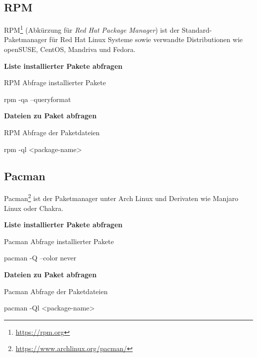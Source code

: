 \subsection{RPM}

RPM\footnote{\url{https://rpm.org}} (Abkürzung für \textit{Red Hat Package
Manager}) ist der Standard-Paketmanager für Red Hat Linux Systeme sowie
verwandte Distributionen wie openSUSE, CentOS, Mandriva und Fedora.

\textbf{Liste installierter Pakete abfragen}

\begin{listing}[H]
\caption{RPM Abfrage installierter Pakete}
\begin{bashcode}
rpm -qa --queryformat %
\end{bashcode}
\end{listing}

\textbf{Dateien zu Paket abfragen}

\begin{listing}[H]
\caption{RPM Abfrage der Paketdateien}
\begin{bashcode}
rpm -ql <package-name>
\end{bashcode}
\end{listing}


\subsection{Pacman}

Pacman\footnote{\url{https://www.archlinux.org/pacman/}} ist der Paketmanager
unter Arch Linux und Derivaten wie Manjaro Linux oder Chakra.

\textbf{Liste installierter Pakete abfragen}

\begin{listing}[H]
\caption{Pacman Abfrage installierter Pakete}
\begin{bashcode}
pacman -Q --color never
\end{bashcode}
\end{listing}

\textbf{Dateien zu Paket abfragen}

\begin{listing}[H]
\caption{Pacman Abfrage der Paketdateien}
\begin{bashcode}
pacman -Ql <package-name>
\end{bashcode}
\end{listing}


